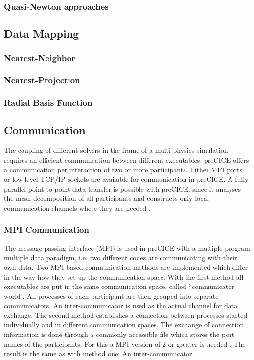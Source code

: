   \subsubsection{Quasi-Newton approaches}

  

 \subsection{Data Mapping} %

  \subsubsection{Nearest-Neighbor}
  
  \subsubsection{Nearest-Projection}
  
  \subsubsection{Radial Basis Function}



 \subsection{Communication} %
  The coupling of different solvers in the frame of a multi-physics simulation requires an efficient communication between different executables. preCICE offers a communication per interaction of two or more participants. Either MPI ports or low level TCP/IP sockets are available for communication in preCICE. A fully parallel point-to-point data transfer is possible with preCICE, since it analyses the mesh decomposition of all participants and constructs only local communication channels where they are needed \cite{bungartz2015fully}.
 
  \subsubsection{MPI Communication}
   The message passing interface (MPI) is used in preCICE with a multiple program multiple data paradigm, i.e. two different codes are communicating with their own data. Two MPI-based communication methods are implemented which differ in the way how they set up the communication space. With the first method all executables are put in the same communication space, called ``communicator world''. All processes of each participant are then grouped into separate communicators. An inter-communicator is used as the actual channel for data exchange.
   The second method establishes a connection between processes started individually and in different communication spaces. The exchange of connection information is done through a commonly accessible file which stores the port names of the participants. For this a MPI version of 2 or greater is needed \cite{gatzhammer2015efficient}. The result is the same as with method one: An inter-communicator.
   
